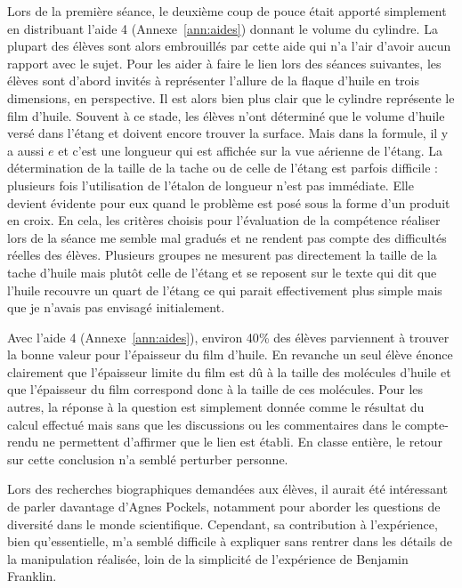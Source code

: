 \documentclass[12pt,a4paper]{article}
\begin{document}
Lors de la première séance, le deuxième coup de pouce était apporté simplement en distribuant l'aide 4 (Annexe~\ref{ann:aides}) donnant le volume du cylindre.
La plupart des élèves sont alors embrouillés par cette aide qui n'a l'air d'avoir aucun rapport avec le sujet.
Pour les aider à faire le lien lors des séances suivantes, les élèves sont d'abord invités à représenter l'allure de la flaque d'huile en trois dimensions, en perspective.
Il est alors bien plus clair que le cylindre représente le film d'huile.
Souvent à ce stade, les élèves n'ont déterminé que le volume d'huile versé dans l'étang et doivent encore trouver la surface.
Mais dans la formule, il y a aussi $e$ et c'est une longueur qui est affichée sur la vue aérienne de l'étang.
La détermination de la taille de la tache ou de celle de l'étang est parfois difficile : plusieurs fois l'utilisation de l'étalon de longueur n'est pas immédiate.
Elle devient évidente pour eux quand le problème est posé sous la forme d'un produit en croix.
En cela, les critères choisis pour l'évaluation de la compétence réaliser lors de la séance me semble mal gradués et ne rendent pas compte des difficultés réelles des élèves.
Plusieurs groupes ne mesurent pas directement la taille de la tache d'huile mais plutôt celle de l'étang et se reposent sur le texte qui dit que l'huile recouvre un quart de l'étang ce qui parait effectivement plus simple mais que je n'avais pas envisagé initialement.

Avec l'aide 4 (Annexe~\ref{ann:aides}), environ \unit{40}{\%} des élèves parviennent à trouver la bonne valeur pour l'épaisseur du film d'huile.
En revanche un seul élève énonce clairement que l'épaisseur limite du film est dû à la taille des molécules d'huile et que l'épaisseur du film correspond donc à la taille de ces molécules.
Pour les autres, la réponse à la question est simplement donnée comme le résultat du calcul effectué mais sans que les discussions ou les commentaires dans le compte-rendu ne permettent d'affirmer que le lien est établi. 
En classe entière, le retour sur cette conclusion n'a semblé perturber personne.

Lors des recherches biographiques demandées aux élèves, il aurait été intéressant de parler davantage d'Agnes Pockels, notamment pour aborder les questions de diversité dans le monde scientifique.
Cependant, sa contribution à l'expérience, bien qu'essentielle, m'a semblé difficile à expliquer sans rentrer dans les détails de la manipulation réalisée, loin de la simplicité de l'expérience de Benjamin Franklin.
\end{document}

